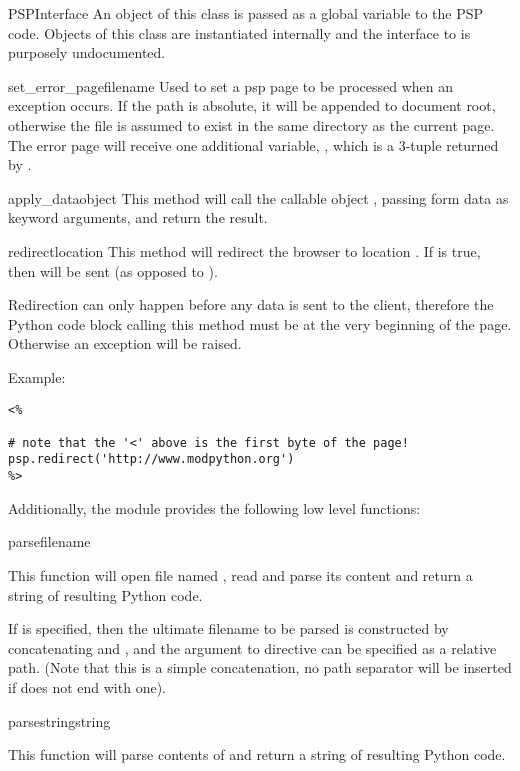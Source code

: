 \begin{classdesc}{PSPInterface}{}
  An object of this class is passed as a global variable  to
  the PSP code. Objects of this class are instantiated internally and
  the interface to  is purposely undocumented.

  \begin{methoddesc}[PSPInterface]{set_error_page}{filename}
    Used to set a psp page to be processed when an exception
    occurs. If the path is absolute, it will be appended to document
    root, otherwise the file is assumed to exist in the same directory
    as the current page. The error page will receive one additional
    variable, , which is a 3-tuple returned by
    .
  \end{methoddesc}

  \begin{methoddesc}[PSPInterface]{apply_data}{object}
    This method will call the callable object , passing form
    data as keyword arguments, and return the result.
  \end{methoddesc}

  \begin{methoddesc}[PSPInterface]{redirect}{location}
    This method will redirect the browser to location
    . If  is true, then
     will be sent (as opposed to
    ).

    \begin{notice}
      Redirection can only happen before any data is sent to the
      client, therefore the Python code block calling this method must
      be at the very beginning of the page. Otherwise an
       exception will be raised.
    \end{notice}

    Example:
    \begin{verbatim}
<%

# note that the '<' above is the first byte of the page!
psp.redirect('http://www.modpython.org')
%>
    \end{verbatim}
  \end{methoddesc}

\end{classdesc}

Additionally, the  module provides the following low level
functions:

\begin{funcdesc}{parse}{filename}

  This function will open file named , read and parse its
  content and return a string of resulting Python code.

  If  is specified, then the ultimate filename to be parsed
  is constructed by concatenating  and , and
  the argument to  directive can be specified as a
  relative path. (Note that this is a simple concatenation, no path
  separator will be inserted if  does not end with one).
\end{funcdesc}

\begin{funcdesc}{parsestring}{string}

  This function will parse contents of  and return a string
  of resulting Python code.

\end{funcdesc}
